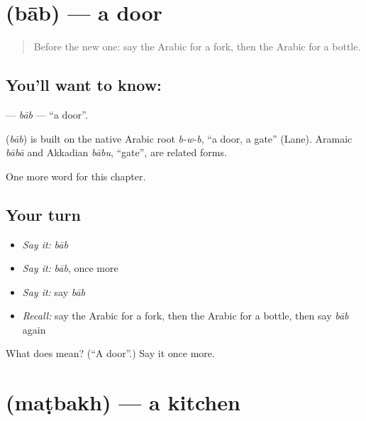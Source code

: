 \section[\texorpdfstring{\ar{باب} (bāb)}{باب (bāb)}]{ (bāb) — a door}

\label{lesson:AR-C72-bab}



\begin{quote}
Before the new one: say the Arabic for a fork, then the Arabic for a bottle.
\end{quote}

\subsection*{You'll want to know: }
\textbf{} — \emph{bāb} — \textquotedblleft{}a door\textquotedblright{}.

\begin{cousinweb}
\textbf{} (\emph{bāb}) is built on the native Arabic root \emph{b-w-b}, \textquotedblleft{}a door, a gate\textquotedblright{} (Lane). Aramaic \emph{bābā} and Akkadian \emph{bābu}, \textquotedblleft{}gate\textquotedblright{}, are related forms.
\end{cousinweb}

\begin{grammarlens}[title={What you've built}]
One more word for this chapter.
\end{grammarlens}

\subsection*{Your turn}
\begin{itemize}
\raggedright
  \item \emph{Say it:} \emph{bāb}
  \item \emph{Say it:} \emph{bāb}, once more
  \item \emph{Say it:} say \emph{bāb}
  \item \emph{Recall:} say the Arabic for a fork, then the Arabic for a bottle, then say \emph{bāb} again
\end{itemize}

\begin{tcolorbox}[breakable,colback=teal!4,colframe=teal!35!black,title={Before you move on}]
What does  mean? (\textquotedblleft{}A door\textquotedblright{}.) Say it once more.
\end{tcolorbox}
\section[\texorpdfstring{\ar{مطبخ} (maṭbakh)}{مطبخ (maṭbakh)}]{ (maṭbakh) — a kitchen}

